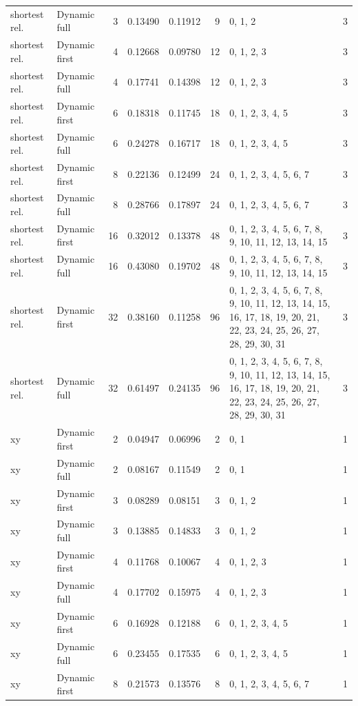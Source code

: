 \documentclass[10pt,a4paper]{article}
\begin{document}
\begin{longtable}{@{}p{23mm}p{29mm}rrrrp{36mm}r@{}}
shortest rel. & Dynamic full & 3 & 0.13490 & 0.11912 & 9 & 0, 1, 2 & 3 \\
shortest rel. & Dynamic first & 4 & 0.12668 & 0.09780 & 12 & 0, 1, 2, 3 & 3 \\
shortest rel. & Dynamic full & 4 & 0.17741 & 0.14398 & 12 & 0, 1, 2, 3 & 3 \\
shortest rel. & Dynamic first & 6 & 0.18318 & 0.11745 & 18 & 0, 1, 2, 3, 4, 5 & 3 \\
shortest rel. & Dynamic full & 6 & 0.24278 & 0.16717 & 18 & 0, 1, 2, 3, 4, 5 & 3 \\
shortest rel. & Dynamic first & 8 & 0.22136 & 0.12499 & 24 & 0, 1, 2, 3, 4, 5, 6, 7 & 3 \\
shortest rel. & Dynamic full & 8 & 0.28766 & 0.17897 & 24 & 0, 1, 2, 3, 4, 5, 6, 7 & 3 \\
shortest rel. & Dynamic first & 16 & 0.32012 & 0.13378 & 48 & 0, 1, 2, 3, 4, 5, 6, 7, 8, 9, 10, 11, 12, 13, 14, 15 & 3 \\
shortest rel. & Dynamic full & 16 & 0.43080 & 0.19702 & 48 & 0, 1, 2, 3, 4, 5, 6, 7, 8, 9, 10, 11, 12, 13, 14, 15 & 3 \\
shortest rel. & Dynamic first & 32 & 0.38160 & 0.11258 & 96 & 0, 1, 2, 3, 4, 5, 6, 7, 8, 9, 10, 11, 12, 13, 14, 15, 16, 17, 18, 19, 20, 21, 22, 23, 24, 25, 26, 27, 28, 29, 30, 31 & 3 \\
shortest rel. & Dynamic full & 32 & 0.61497 & 0.24135 & 96 & 0, 1, 2, 3, 4, 5, 6, 7, 8, 9, 10, 11, 12, 13, 14, 15, 16, 17, 18, 19, 20, 21, 22, 23, 24, 25, 26, 27, 28, 29, 30, 31 & 3 \\
xy & Dynamic first & 2 & 0.04947 & 0.06996 & 2 & 0, 1 & 1 \\
xy & Dynamic full & 2 & 0.08167 & 0.11549 & 2 & 0, 1 & 1 \\
xy & Dynamic first & 3 & 0.08289 & 0.08151 & 3 & 0, 1, 2 & 1 \\
xy & Dynamic full & 3 & 0.13885 & 0.14833 & 3 & 0, 1, 2 & 1 \\
xy & Dynamic first & 4 & 0.11768 & 0.10067 & 4 & 0, 1, 2, 3 & 1 \\
xy & Dynamic full & 4 & 0.17702 & 0.15975 & 4 & 0, 1, 2, 3 & 1 \\
xy & Dynamic first & 6 & 0.16928 & 0.12188 & 6 & 0, 1, 2, 3, 4, 5 & 1 \\
xy & Dynamic full & 6 & 0.23455 & 0.17535 & 6 & 0, 1, 2, 3, 4, 5 & 1 \\
xy & Dynamic first & 8 & 0.21573 & 0.13576 & 8 & 0, 1, 2, 3, 4, 5, 6, 7 & 1 \\

\end{longtable}
\end{document}
